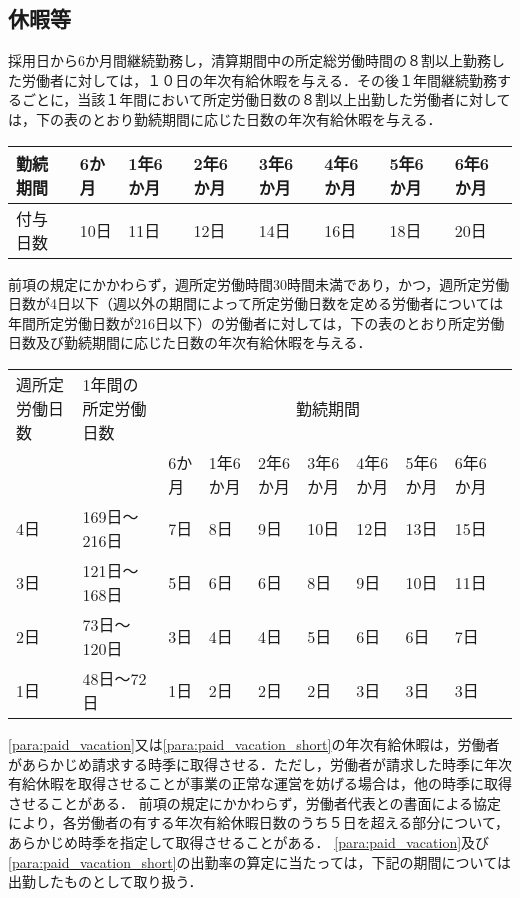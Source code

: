 \documentclass[11pt,a4paper]{jsarticle}
\begin{document}
\subsection{休暇等}
採用日から6か月間継続勤務し，清算期間中の所定総労働時間の８割以上勤務した労働者に対しては，１０日の年次有給休暇を与える．その後１年間継続勤務するごとに，当該１年間において所定労働日数の８割以上出勤した労働者に対しては，下の表のとおり勤続期間に応じた日数の年次有給休暇を与える．	\begin{tabular}{|l|p{2.5em}|p{2.5em}|p{2.5em}|p{2.5em}|p{2.5em}|p{2.5em}|p{2.5em}|} \hline
	勤続期間 & 6か月 & 1年6か月& 2年6か月& 3年6か月& 4年6か月& 5年6か月& 6年6か月 \\ \hline \hline
	付与日数 & 10日 & 11日& 12日& 14日& 16日& 18日& 20日 \\ \hline
\end{tabular}
\label{para:paid_vacation}
\term
前項の規定にかかわらず，週所定労働時間30時間未満であり，かつ，週所定労働日数が4日以下（週以外の期間によって所定労働日数を定める労働者については年間所定労働日数が216日以下）の労働者に対しては，下の表のとおり所定労働日数及び勤続期間に応じた日数の年次有給休暇を与える．
\begin{tabular}{|p{3em}|p{4em}|p{2.5em}|p{2.5em}|p{2.5em}|p{2.5em}|p{2.5em}|p{2.5em}|p{2.5em}|p{2.5em}|} \hline
	週所定労働日数 & 1年間の所定労働日数 & \multicolumn{7}{|c|}{勤続期間} \\ \cline{3-9}
	& & 6か月 & 1年6か月& 2年6か月& 3年6か月& 4年6か月& 5年6か月& 6年6か月 \\ \hline \hline
	4日 & 169日～216日 & 7日 & 8日& 9日& 10日& 12日& 13日& 15日 \\ \hline
	3日 & 121日～168日 & 5日 & 6日& 6日&  8日&  9日& 10日& 11日 \\ \hline
	2日 & 73日～120日  & 3日 & 4日& 4日&  5日&  6日&  6日&  7日 \\ \hline
	1日 & 48日～72日   & 1日 & 2日& 2日&  2日&  3日&  3日&  3日 \\ \hline
\end{tabular}
\label{para:paid_vacation_short}
\term
\ref{para:paid_vacation}又は\ref{para:paid_vacation_short}の年次有給休暇は，労働者があらかじめ請求する時季に取得させる．ただし，労働者が請求した時季に年次有給休暇を取得させることが事業の正常な運営を妨げる場合は，他の時季に取得させることがある．
\term
前項の規定にかかわらず，労働者代表との書面による協定により，各労働者の有する年次有給休暇日数のうち５日を超える部分について，あらかじめ時季を指定して取得させることがある．
\term
\ref{para:paid_vacation}及び\ref{para:paid_vacation_short}の出勤率の算定に当たっては，下記の期間については出勤したものとして取り扱う．
\end{document}
